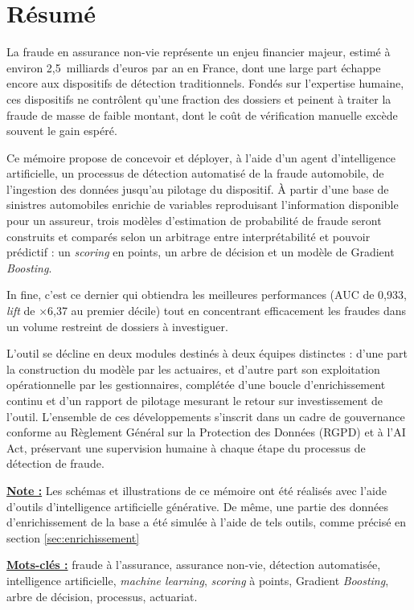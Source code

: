 \chapter*{Résumé}
{}

La fraude en assurance non-vie représente un enjeu financier majeur, estimé à environ 2,5~milliards d'euros par an en France, dont une large part échappe encore aux dispositifs de détection traditionnels. Fondés sur l'expertise humaine, ces dispositifs ne contrôlent qu'une fraction des dossiers et peinent à traiter la fraude de masse de faible montant, dont le coût de vérification manuelle excède souvent le gain espéré.

Ce mémoire propose de concevoir et déployer, à l'aide d'un agent d'intelligence artificielle, un processus de détection automatisé de la fraude automobile, de l'ingestion des données jusqu'au pilotage du dispositif. À partir d'une base de sinistres automobiles enrichie de variables reproduisant l'information disponible pour un assureur, trois modèles d'estimation de probabilité de fraude seront construits et comparés selon un arbitrage entre interprétabilité et pouvoir prédictif : un \textit{scoring} en points, un arbre de décision et un modèle de Gradient \textit{Boosting}. 

In fine, c'est ce dernier qui obtiendra les meilleures performances (AUC de 0,933, \textit{lift} de $\times$6,37 au premier décile) tout en concentrant efficacement les fraudes dans un volume restreint de dossiers à investiguer.

L'outil se décline en deux modules destinés à deux équipes distinctes : d'une part la construction du modèle par les actuaires, et d'autre part son exploitation opérationnelle par les gestionnaires, complétée d'une boucle d'enrichissement continu et d'un rapport de pilotage mesurant le retour sur investissement de l'outil. L'ensemble de ces développements s'inscrit dans un cadre de gouvernance conforme au Règlement Général sur la Protection des Données (RGPD) et à l'AI Act, préservant une supervision humaine à chaque étape du processus de détection de fraude.

\underline{\textbf{Note :}} Les schémas et illustrations de ce mémoire ont été réalisés avec l'aide d'outils d'intelligence artificielle générative. De même, une partie des données d'enrichissement de la base a été simulée à l'aide de tels outils, comme précisé en section \ref{sec:enrichissement}

\underline{\textbf{Mots-clés :}} fraude à l'assurance, assurance non-vie, détection automatisée, intelligence artificielle, \textit{machine learning}, \textit{scoring} à points, Gradient \textit{Boosting}, arbre de décision, processus, actuariat.
